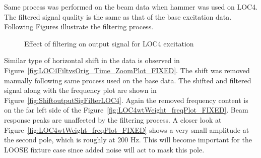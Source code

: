 \documentclass[paper=a4, fontsize=12pt]{scrartcl} %
\begin{document}
Same process was performed on the beam data when hammer was used on LOC4. The filtered signal quality is the same as that of the base excitation data. Following Figures illustrate the filtering process.
%
	\begin{figure}[H]
		\centering
		\quad
		\caption{Effect of filtering on output signal for LOC4 excitation}
		\label{fig:outputSigFilterLOC4}
	\end{figure}
%
Similar type of horizontal shift in the data is observed in Figure~\ref{fig:LOC4FiltvsOrig_Time_ZoomPlot_FIXED}. The shift was removed manually following same process used on the base data. The shifted and filtered signal along with the frequency plot are shown in Figure~\ref{fig:ShiftoutputSigFilterLOC4}. Again the removed frequency content is on the far left side of the Figure~\ref{fig:LOC4wtWeight_freqPlot_FIXED}. Beam response peaks are unaffected by the filtering process. A closer look at Figure~\ref{fig:LOC4wtWeight_freqPlot_FIXED} shows a very small amplitude at the second pole, which is roughly at 200 Hz. This will become important for the LOOSE fixture case since added noise will act to mask this pole.
\end{document}
